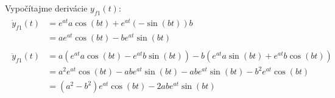 \documentclass[a4paper, 10pt, ]{article}
\begin{document}
Vypočítajme derivácie $y_{f1}(t)$:
\begin{subequations}
    \begin{align}
        \begin{split}
            \dot y_{f1}(t) &= e^{at} a \cos(bt) + e^{at}  \left( -\sin(bt) \right) b \\
            &= a e^{at} \cos(bt) - b e^{at} \sin(bt) 
        \end{split} \\
        \begin{split}
            \ddot y_{f1}(t) &= a \left( e^{at} a \cos(bt) - e^{at} b \sin(bt) \right)
            - b \left( e^{at} a \sin(bt) + e^{at} b \cos(bt) \right) \\
            &= a^2 e^{at} \cos(bt) - a b e^{at} \sin(bt) - a b e^{at} \sin(bt) - b^2 e^{at} \cos(bt) \\
            &= \left( a^2 - b^2  \right) e^{at} \cos(bt) - 2 a b e^{at} \sin(bt)
        \end{split}
    \end{align}
\end{subequations}
\end{document}
